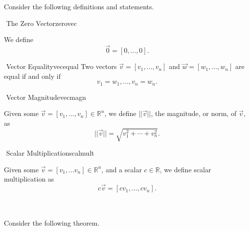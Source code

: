     \vphantom
    \pagebreak
    \\
    \\
    Consider the following definitions and statements.
    \begin{definition}{\Stop\,\,The Zero Vector}{zerovec}

        We define 
        \begin{equation*}
            \vec{0}=[0,\ldots,0].
        \end{equation*}
        
    \end{definition}
    \begin{definition}{\Stop\,\,Vector Equality}{vecequal}
        Two vectors \(\vec{v}=[v_1,\ldots,v_n]\) and \(\vec{w}=[w_1,\ldots,w_n]\) are equal if and only if
        \begin{equation*}
            v_1=w_1,\ldots,v_n=w_n.
        \end{equation*}
    \end{definition}
    \begin{definition}{\Stop\,\,Vector Magnitude}{vecmagn}

        Given some \(\vec{v}=[v_1,\ldots, v_n]\in\mathbb{R}^n\), we define \(||\vec{v}||\), the magnitude, or norm, of \(\vec{v}\), as
        \begin{equation*}
            ||\vec{v}||=\sqrt{v_1^2+\cdots+v_n^2}.
        \end{equation*}
        
    \end{definition}
    \begin{definition}{\Stop\,\,Scalar Multiplication}{scalmult}

        Given some \(\vec{v}=[v_1,\ldots v_n]\in\mathbb{R}^n\), and a scalar \(c\in\mathbb{R}\), we define scalar multiplication as
        \begin{equation*}
            c\vec{v}=[cv_1,\ldots, cv_n].
        \end{equation*}
        
    \end{definition}
    \vphantom
    \\
    \\
    Consider the following theorem.
